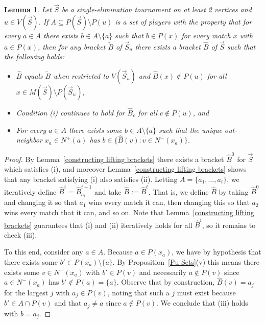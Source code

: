 \documentclass[12pt,letterpaper]{article}
\newtheorem{lem}[thm]{Lemma}
\theoremstyle{definition}
\renewcommand{\1}{\mathbbm{1}}
\newcommand{\sm}{\setminus}
\newcommand{\sub}{\subseteq}
\newcommand{\tour}{\vec{S}}
\begin{document}
\begin{lem}\label{constructing better lifting brackets}
	Let $\tour$ be a single-elimination tournament on at least 2 vertices and $u\in V(\tour)$.  If $A\sub P(\tour)\sm P(u)$ is a set of players with the property that for every $a\in A$ there exists $b\in A\sm \{a\}$ such that $b\in P(x)$ for every match $x$ with $a\in P(x)$, then for any bracket $\widetilde{B}$ of $\tour_u$ there exists a bracket $\widehat{B}$ of $\tour$ such that the following holds:
	\begin{itemize}
		\item[(i)] $\widehat{B}$ equals $\widetilde{B}$ when restricted to $V(\tour_u)$ and $\widehat{B}(x)\notin P(u)$ for all $x\in M(\tour)\sm P(\tour_u)$,
		\item[(ii)] Condition (i) continues to hold for $\widehat{B}_c$ for all $c\notin P(u)$, and
		\item[(iii)] For every $a\in A$ there exists some $b\in A\sm \{a\}$ such that the unique out-neighbor $x_a\in N^+(a)$ has $b\in \{\widehat{B}(v):v\in N^-(x_a)\}$.
	\end{itemize}
\end{lem}
\begin{proof}
	By Lemma~\ref{constructing lifting brackets} there exists a bracket $\widehat{B}^0$ for $\tour$ which satisfies (i), and moreover Lemma~\ref{constructing lifting brackets} shows that any bracket satisfying (i) also satisfies (ii).  Letting $A=\{a_1,\ldots,a_t\}$, we iteratively define $\widehat{B}^i=\widehat{B}_{a_i}^{i-1}$ and take $\widehat{B}:=\widehat{B}^t$.  That is, we define $\widehat{B}$ by taking $\widehat{B}^0$ and changing it so that $a_1$ wins every match it can, then changing this so that $a_2$ wins every match that it can, and so on.  Note that Lemma~\ref{constructing lifting brackets} guarantees that (i) and (ii) iteratively holds for all $\widehat{B}^i$, so it remains to check (iii).
	
	To this end, consider any $a\in A$.  Because $a\in P(x_{a})$, we have by hypothesis that there exists some $b'\in P(x_{a})\sm \{a\}$.  By Proposition~\ref{Pu Sets}(v) this means there exists some $v\in N^-(x_a)$ with $b'\in P(v)$ and necessarily $a\notin P(v)$ since $a\in N^-(x_a)$ has $b'\notin P(a)=\{a\}$.  Observe that by construction, $\widehat{B}(v)=a_j$ for the largest $j$ with $a_j\in P(v)$, noting that such a $j$ must exist because $b'\in A\cap P(v)$ and that $a_j\ne a$ since $a\notin P(v)$.  We conclude that (iii) holds with $b=a_j$.
\end{proof}
\end{document}
